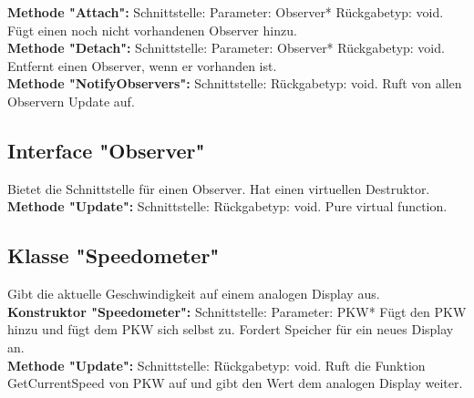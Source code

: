\documentclass[12pt,a4paper]{article}
\begin{document}
\textbf {Methode "Attach": } 
\newline
Schnittstelle: 
\newline
Parameter: Observer*
\newline
Rückgabetyp: void.
\newline
Fügt einen noch nicht vorhandenen Observer hinzu.
\\

\textbf {Methode "Detach": } 
\newline
Schnittstelle:
\newline
Parameter: Observer*
\newline
Rückgabetyp: void.
\newline
Entfernt einen Observer, wenn er vorhanden ist.
\\

\textbf {Methode "NotifyObservers": } 
\newline
Schnittstelle:
\newline
Rückgabetyp: void.
\newline
Ruft von allen Observern Update auf.
\\


\subsection {Interface "Observer"}
Bietet die Schnittstelle für einen Observer. Hat einen virtuellen Destruktor.
\\

\textbf {Methode "Update": } 
\newline
Schnittstelle: 
\newline
Rückgabetyp: void.
\newline
Pure virtual function.
\\

\subsection {Klasse "Speedometer"}
Gibt die aktuelle Geschwindigkeit auf einem analogen Display aus.
\\

\textbf {Konstruktor "Speedometer": } 
\newline
Schnittstelle: 
\newline
Parameter: PKW*
\newline
Fügt den PKW hinzu und fügt dem PKW sich selbst zu. Fordert Speicher für ein neues Display an.
\\

\textbf {Methode "Update": } 
\newline
Schnittstelle: 
\newline
Rückgabetyp: void.
\newline
Ruft die Funktion GetCurrentSpeed von PKW auf und gibt den Wert dem analogen Display weiter.
\\
\end{document}
